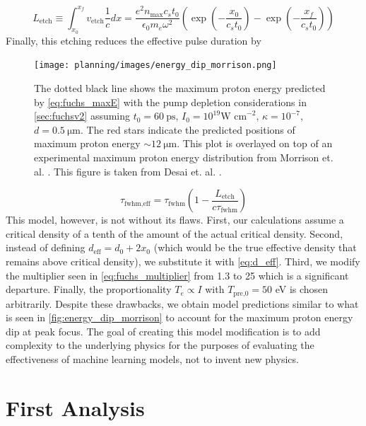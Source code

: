 \begin{equation}
	L_\text{etch} \equiv \int_{x_0}^{x_f} v_\text{etch} \frac{1}{c} dx = \frac{e^2 n_\text{max} c_s t_0}{\epsilon_0 m_e \omega^2} \left( \exp{\left(-\frac{x_0}{c_s t_0}\right)} - \exp{\left(-\frac{x_f}{c_s t_0}\right)} \right)
\end{equation}
Finally, this etching reduces the effective pulse duration by 

\begin{figure}
	\centering 
	\texttt{[image: planning/images/energy\_dip\_morrison.png]}
	\caption{The dotted black line shows the maximum proton energy predicted by \autoref{eq:fuchs_maxE} with the pump depletion considerations in \autoref{sec:fuchsv2} assuming $t_0 = \SI{60}{\pico \second}$, $I_0 = 10^{19} \text{W cm}^{-2}$, $\kappa=10^{-7}$, $d=\SI{0.5}{\micro \meter}$. The red stars indicate the predicted positions of maximum proton energy $\sim \SI{12}{\micro \meter}$. This plot is overlayed on top of an experimental maximum proton energy distribution from Morrison et. al. \cite{Morrison_2018_NJoP}. This figure is taken from Desai et. al. \cite{Desai_2025_APL}.}
	\label{fig:energy_dip_morrison}
\end{figure}
\begin{equation}
	\tau_\text{fwhm,eff} = \tau_\text{fwhm} (1 - \frac{L_\text{etch}}{c \tau_\text{fwhm}}) \label{eq:tau_etch}
\end{equation}
This model, however, is not without its flaws. First, our calculations assume a critical density of a tenth of the amount of the actual critical density. Second, instead of defining $d_\text{eff} = d_0 + 2 x_0$ (which would be the true effective density that remains above critical density), we substitute it with \autoref{eq:d_eff}. Third, we modify the multiplier seen in \autoref{eq:fuchs_multiplier} from 1.3 to 25 which is a significant departure. Finally, the proportionality $T_e \propto I$ with $T_\text{pre,0} = 50$ eV is chosen arbitrarily. Despite these drawbacks, we obtain model predictions similar to what is seen in \autoref{fig:energy_dip_morrison} to account for the maximum proton energy dip at peak focus. The goal of creating this model modification is to add complexity to the underlying physics for the purposes of evaluating the effectiveness of machine learning models, not to invent new physics. 

\section{First Analysis} \label{sec:first_analysis}

